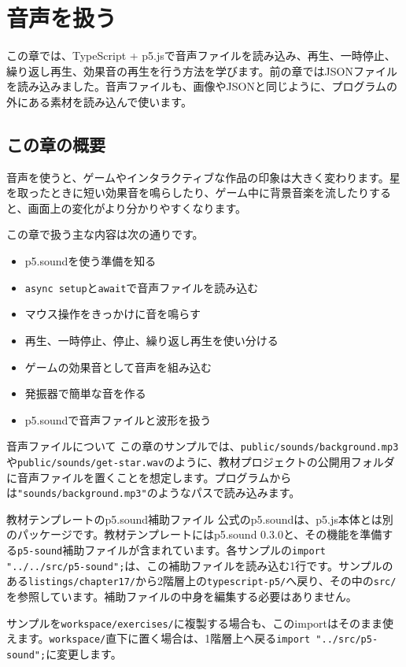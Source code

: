 \chapter{音声を扱う}
\label{chap:sound}

この章では、TypeScript + p5.jsで音声ファイルを読み込み、再生、一時停止、繰り返し再生、効果音の再生を行う方法を学びます。前の章ではJSONファイルを読み込みました。音声ファイルも、画像やJSONと同じように、プログラムの外にある素材を読み込んで使います。

\section{この章の概要}

音声を使うと、ゲームやインタラクティブな作品の印象は大きく変わります。星を取ったときに短い効果音を鳴らしたり、ゲーム中に背景音楽を流したりすると、画面上の変化がより分かりやすくなります。

この章で扱う主な内容は次の通りです。

\begin{itemize}
    \item p5.soundを使う準備を知る
    \item \texttt{async setup}と\texttt{await}で音声ファイルを読み込む
    \item マウス操作をきっかけに音を鳴らす
    \item 再生、一時停止、停止、繰り返し再生を使い分ける
    \item ゲームの効果音として音声を組み込む
    \item 発振器で簡単な音を作る
    \item p5.soundで音声ファイルと波形を扱う
\end{itemize}

\begin{notebox}{音声ファイルについて}
この章のサンプルでは、\texttt{public/sounds/background.mp3}や\texttt{public/sounds/get-star.wav}のように、教材プロジェクトの公開用フォルダに音声ファイルを置くことを想定します。プログラムからは\texttt{"sounds/background.mp3"}のようなパスで読み込みます。
\end{notebox}

\begin{notebox}{教材テンプレートのp5.sound補助ファイル}
公式のp5.soundは、p5.js本体とは別のパッケージです。教材テンプレートにはp5.sound 0.3.0と、その機能を準備する\texttt{p5-sound}補助ファイルが含まれています。各サンプルの\texttt{import "../../src/p5-sound";}は、この補助ファイルを読み込む1行です。サンプルのある\texttt{listings/chapter17/}から2階層上の\texttt{typescript-p5/}へ戻り、その中の\texttt{src/}を参照しています。補助ファイルの中身を編集する必要はありません。

サンプルを\texttt{workspace/exercises/}に複製する場合も、このimportはそのまま使えます。\texttt{workspace/}直下に置く場合は、1階層上へ戻る\texttt{import "../src/p5-sound";}に変更します。
\end{notebox}

